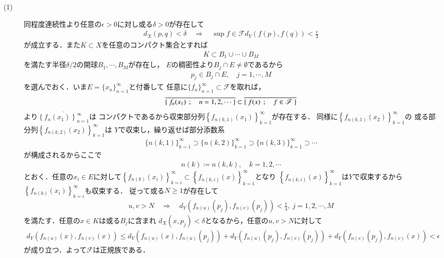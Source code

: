 	\begin{prf}\mbox{}
		\begin{description}
			\item[(1)]
				同程度連続性より任意の$\epsilon > 0$に対し或る$\delta > 0$が存在して
				\begin{align}
					d_X(p,q) < \delta \quad \Longrightarrow \quad
					\sup{f \in \mathscr{F}}{d_Y(f(p),f(q))} < \frac{\epsilon}{3}
				\end{align}
				が成立する．また$K \subset X$を任意のコンパクト集合とすれば
				\begin{align}
					K \subset B_1 \cup \cdots \cup B_M
				\end{align}
				を満たす半径$\delta/2$の開球$B_1,\cdots,B_M$が存在し，
				$E$の稠密性より$B_j \cap E \neq \emptyset$であるから
				\begin{align}
					p_j \in B_j \cap E, \quad j=1,\cdots,M
				\end{align}
				を選んでおく．いま$E = \{x_n\}_{n=1}^\infty$と付番して
				任意に$\{f_n\}_{n=1}^\infty \subset \mathscr{F}$を取れば，
				\begin{align}
					\overline{\left\{\ f_n(x_1)\ \, ; \quad n=1,2,\cdots\ \right\}}
					\subset \overline{\left\{\ f(x)\ \, ; \quad f \in \mathscr{F}\ \right\}}
				\end{align}
				より$\overline{\left\{f_{n}(x_1)\right\}_{n=1}^\infty}$は
				コンパクトであるから収束部分列$\left\{f_{n(k,1)}(x_1)\right\}_{k=1}^\infty$が存在する．
				同様に$\left\{f_{n(k,1)}(x_2)\right\}_{k=1}^\infty$の
				或る部分列$\left\{f_{n(k,2)}(x_2)\right\}_{k=1}^\infty$は
				$Y$で収束し，繰り返せば部分添数系
				\begin{align}
					\{n(k,1)\}_{k=1}^\infty \supset
					\{n(k,2)\}_{k=1}^\infty \supset
					\{n(k,3)\}_{k=1}^\infty \supset
					\cdots
				\end{align}
				が構成されるからここで
				\begin{align}
					n(k) \coloneqq n(k,k), \quad k=1,2,\cdots
				\end{align}
				とおく．任意の$x_i \in E$に対して$\left\{f_{n(k)}(x_i)\right\}_{k=i}^\infty
				\subset \left\{f_{n(k,i)}(x)\right\}_{k=1}^\infty$となり
				$\left\{f_{n(k,i)}(x)\right\}_{k=1}^\infty$は$Y$で収束するから
				$\left\{f_{n(k)}(x_i)\right\}_{k=i}^\infty$も収束する．
				従って或る$N \geq 1$が存在して
				\begin{align}
					u,v > N \quad \Longrightarrow \quad
					d_Y\left(f_{n(u)}(p_j),f_{n(v)}(p_j)\right) < \frac{\epsilon}{3},\ j=1,2,\cdots,M
				\end{align}
				を満たす．任意の$x \in K$は或る$B_j$に含まれ
				$d_X(x,p_j) < \delta$となるから，任意の$u,v > N$に対して
				\begin{align}
					d_Y(f_{n(u)}(x),f_{n(v)}(x)) \leq 
					d_Y\left(f_{n(u)}(x),f_{n(u)}(p_j)\right) 
					+ d_Y\left(f_{n(u)}(p_j),f_{n(v)}(p_j)\right)
					+ d_Y\left(f_{n(v)}(p_j),f_{n(v)}(x)\right)
					< \epsilon
				\end{align}
				が成り立つ．よって$\mathscr{F}$は正規族である．
		\end{description}
	\end{prf}
